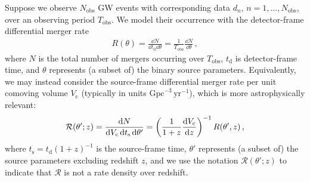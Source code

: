 \begin{refsection}
Suppose we observe $N_\mathrm{obs}$ GW events with corresponding data $d_n$, $n=1,...,N_\mathrm{obs}$, over an observing period $T_\mathrm{obs}$. We model their occurrence with the detector-frame differential merger rate
\begin{align}
\label{eq: rate density}
R ( \theta )
=
\frac { \dd{N} } { \dd{t_\mathrm{d}} \dd{\theta} }
=
\frac { 1 } { T_\mathrm{obs} }
\frac { \dd{N} } { \dd{\theta} }
\, ,
\end{align}
where $N$ is the total number of mergers occurring over $T_\mathrm{obs}$, $t_\mathrm{d}$ is detector-frame time, and $\theta$ represents (a subset of) the binary source parameters. Equivalently, we may instead consider the source-frame differential merger rate per unit comoving volume $V_\mathrm{c}$ (typically in units $\mathrm{Gpc}^{-3} \, \mathrm{yr}^{-1}$), which is more astrophysically relevant:
\begin{align}
\label{eq: comoving rate density}
\mathcal{R} ( \theta' ; z )
=
\frac
{ \dd{N} }
{ \dd{V_\mathrm{c}} \dd{t_\mathrm{s}} \dd{\theta'} }
=
\left( \frac { 1 } { 1 + z } \dv {V_\mathrm{c}} {z} \right)^{-1}
R ( \theta' , z )
\, ,
\end{align}
where $t_\mathrm{s} = t_\mathrm{d} (1+z)^{-1}$ is the source-frame time, $\theta'$ represents (a subset of) the source parameters excluding redshift $z$, and we use the notation $\mathcal{R} ( \theta' ; z )$ to indicate that $\mathcal{R}$ is not a rate density over redshift.


\end{refsection}
